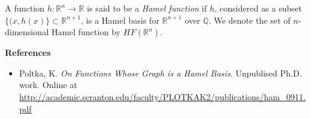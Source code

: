 \documentclass[12pt]{article}
\begin{document}
A function $h : \mathbb{R}^n \to \mathbb{R}$ is said to be a \emph{Hamel function} if $h$, considered as a subset $\{(x,h(x)\}\subset \mathbb{R}^{n+1}$, is a Hamel basis for $\mathbb{R}^{n+1}$ over $\mathbb{Q}$.  We denote the set of $n$-dimensional Hamel function by $HF(\mathbb{R}^n)$.

{\bf References}
\begin{itemize}
\item Poltka, K.  \emph{On Functions Whose Graph is a Hamel Basis}.  Unpublised Ph.D. work.  Online at \url{http://academic.scranton.edu/faculty/PLOTKAK2/publications/ham_0911.pdf}
\end{itemize}
\end{document}

